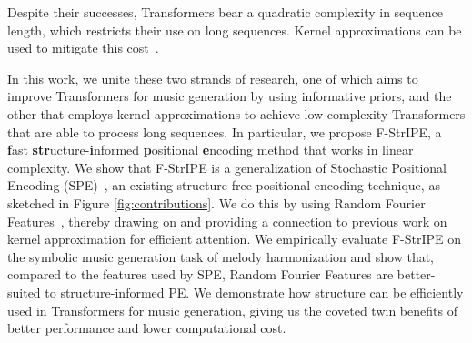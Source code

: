 Despite their successes, Transformers bear a quadratic complexity in sequence length, which restricts their use on long sequences. Kernel approximations can be used to mitigate this cost~\cite{tay_efficient_2022, tsai_transformer_2019}.

In this work, we unite these two strands of research, one of which aims to improve Transformers for music generation by using informative priors, and the other that employs kernel approximations to achieve low-complexity Transformers that are able to process long sequences.
In particular, we propose F-StrIPE, a \textbf{f}ast \textbf{str}ucture-\textbf{i}nformed \textbf{p}ositional \textbf{e}ncoding method that works in linear complexity. We show that F-StrIPE is a generalization of Stochastic Positional Encoding (SPE)~\cite{liutkus_relative_2021}, an existing structure-free positional encoding technique, as sketched in Figure \ref{fig:contributions}. We do this by using Random Fourier Features~\cite{rahimi_random_2007}, thereby drawing on and providing a connection to previous work on kernel approximation for efficient attention. We empirically evaluate F-StrIPE on the symbolic music generation task of melody harmonization and show that, compared to the features used by SPE, Random Fourier Features are better-suited to structure-informed PE. We demonstrate how structure can be efficiently used in Transformers for music generation, giving us the coveted twin benefits of better performance and lower computational cost.
